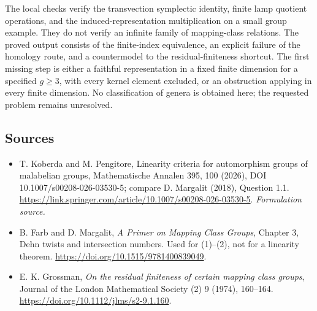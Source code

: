 \documentclass[11pt]{article}
\begin{document}
The local checks verify the transvection symplectic identity, finite lamp quotient operations, and the induced-representation multiplication on a small group example. They do not verify an infinite family of mapping-class relations. The proved output consists of the finite-index equivalence, an explicit failure of the homology route, and a countermodel to the residual-finiteness shortcut. The first missing step is either a faithful representation in a fixed finite dimension for a specified $g\ge3$, with every kernel element excluded, or an obstruction applying in every finite dimension. No classification of genera is obtained here; the requested problem remains unresolved.

\subsection{Sources}
\begin{itemize}
\item[S1]T. Koberda and M. Pengitore, Linearity criteria for automorphism groups of malabelian groups, Mathematische Annalen 395, 100 (2026), DOI 10.1007/s00208-026-03530-5; compare D. Margalit (2018), Question 1.1.
\url{https://link.springer.com/article/10.1007/s00208-026-03530-5}.
\textit{Formulation source.}
\item[E1]B. Farb and D. Margalit, \textit{A Primer on Mapping Class Groups}, Chapter 3, Dehn twists and intersection numbers. Used for (1)--(2), not for a linearity theorem.
\url{https://doi.org/10.1515/9781400839049}.
\item[E2]E. K. Grossman, \textit{On the residual finiteness of certain mapping class groups}, Journal of the London Mathematical Society (2) 9 (1974), 160--164.
\url{https://doi.org/10.1112/jlms/s2-9.1.160}.

\end{itemize}
\end{document}
